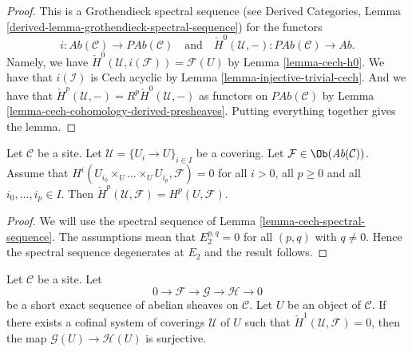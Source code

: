 \begin{proof}
This is a Grothendieck spectral sequence (see
Derived Categories, Lemma \ref{derived-lemma-grothendieck-spectral-sequence})
for the functors
$$
i :  \textit{Ab}(\mathcal{C}) \to \textit{PAb}(\mathcal{C})
\quad\text{and}\quad
\check{H}^0(\mathcal{U}, - ) : \textit{PAb}(\mathcal{C})
\to \textit{Ab}.
$$
Namely, we have $\check{H}^0(\mathcal{U}, i(\mathcal{F})) = \mathcal{F}(U)$
by Lemma \ref{lemma-cech-h0}. We have that $i(\mathcal{I})$ is
Cech acyclic by Lemma \ref{lemma-injective-trivial-cech}. And we
have that $\check{H}^p(\mathcal{U}, -) = R^p\check{H}^0(\mathcal{U}, -)$
as functors on $\textit{PAb}(\mathcal{C})$
by Lemma \ref{lemma-cech-cohomology-derived-presheaves}.
Putting everything together gives the lemma.
\end{proof}

\begin{lemma}
\label{lemma-cech-spectral-sequence-application}
Let $\mathcal{C}$ be a site.
Let $\mathcal{U} = \{U_i \to U\}_{i \in I}$ be a covering.
Let $\mathcal{F} \in \Ob(\textit{Ab}(\mathcal{C}))$.
Assume that $H^i(U_{i_0} \times_U \ldots \times_U U_{i_p}, \mathcal{F}) = 0$
for all $i > 0$, all $p \geq 0$ and all $i_0, \ldots, i_p \in I$.
Then $\check{H}^p(\mathcal{U}, \mathcal{F}) = H^p(U, \mathcal{F})$.
\end{lemma}

\begin{proof}
We will use the spectral sequence of
Lemma \ref{lemma-cech-spectral-sequence}.
The assumptions mean that $E_2^{p, q} = 0$ for all $(p, q)$ with
$q \not = 0$. Hence the spectral sequence degenerates at $E_2$
and the result follows.
\end{proof}

\begin{lemma}
\label{lemma-ses-cech-h1}
Let $\mathcal{C}$ be a site.
Let
$$
0 \to \mathcal{F} \to \mathcal{G} \to \mathcal{H} \to 0
$$
be a short exact sequence of abelian sheaves on $\mathcal{C}$.
Let $U$ be an object of $\mathcal{C}$. If there exists a cofinal system
of coverings $\mathcal{U}$ of $U$ such that
$\check{H}^1(\mathcal{U}, \mathcal{F}) = 0$,
then the map $\mathcal{G}(U) \to \mathcal{H}(U)$ is
surjective.
\end{lemma}


